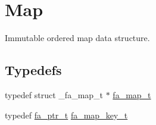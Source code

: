 \hypertarget{group___fa_map}{\section{Map}
\label{group___fa_map}
}


Immutable ordered map data structure.  


\subsection*{Typedefs}
\begin{DoxyCompactItemize}
\item 
typedef struct \-\_\-fa\-\_\-map\-\_\-t $\ast$ \hyperlink{group___fa_map_gadcbb0c425af31be6aeb265159b2a7db0}{fa\-\_\-map\-\_\-t}
\item 
typedef \hyperlink{group___fa_ga915ddeae99ad7568b273d2b876425197}{fa\-\_\-ptr\-\_\-t} \hyperlink{group___fa_map_ga01c714699c14e805664c65b6a0ea974d}{fa\-\_\-map\-\_\-key\-\_\-t}
\end{DoxyCompactItemize}
